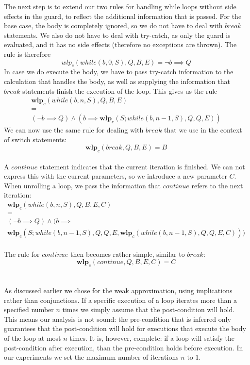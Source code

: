 \documentclass[a4paper, fleqn]{article}
\newcommand{\wlp}{\textbf{wlp}\xspace}
\begin{document}
The next step is to extend our two rules for handling while loops without side effects in the guard, to reflect the additional information that is passed. For the base case, the body is completely ignored, so we do not have to deal with $break$ statements. We also do not have to deal with try-catch, as only the guard is evaluated, and it has no side effects (therefore no exceptions are thrown). The rule is therefore \[wlp_{c}(while(b, 0, S), Q, B, E) = \neg b \implies Q\] In case we do execute the body, we have to pass try-catch information to the calculation that handles the body, as well as supplying the information that $break$ statements finish the execution of the loop. This gives us the rule
\[\begin{array}{c}\wlp_{c}(while(b, n, S), Q, B, E) \\
= \\
(\neg b \implies Q) \land (b \implies \wlp_{c}(S;while(b, n-1, S), Q, Q, E)) \end{array}\] 
We can now use the same rule for dealing with $break$ that we use in the context of switch statements: \[\wlp_{c}(break, Q, B, E) = B\]
\\
A $continue$ statement indicates that the current iteration is finished. We can not express this with the current parameters, so we introduce a new parameter $C$. When unrolling a loop, we pass the information that $continue$ refers to the next iteration: 
\[\begin{array}{c}
\wlp_{c}(while(b, n, S), Q, B, E, C) \\
=\\
(\neg b \implies Q) \land (b \implies \\
\wlp_{c}(S;while(b, n-1, S), Q, Q, E, \wlp_{c}(while(b, n-1, S), Q, Q, E, C)))
\end{array}\]
\\
The rule for $continue$ then becomes rather simple, similar to $break$: \[\wlp_{c}(continue, Q, B, E, C) = C\]
\\
\\
As discussed earlier we chose for the weak approximation, using implications rather than conjunctions. If a specific execution of a loop iterates more than a specified number $n$ times we simply assume that the post-condition will hold. This means our analysis is not sound: the pre-condition that is inferred only guarantees that the post-condition will hold for executions that execute the body of the loop at most $n$ times. It is, however, complete: if a loop will satisfy the post-condition after execution, than the pre-condition holds before execution. In our experiments we set the maximum number of iterations $n$ to 1.
\end{document}
